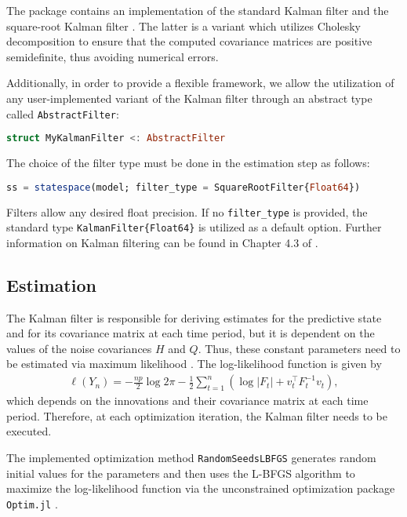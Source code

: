\documentclass{juliacon}
\begin{document}
The package contains an implementation of the standard Kalman filter and the square-root Kalman filter \cite{durbin2012time}. The latter is a variant which utilizes Cholesky decomposition to ensure that the computed covariance matrices are positive semidefinite, thus avoiding numerical errors.

Additionally, in order to provide a flexible framework, we allow the utilization of any user-implemented variant of the Kalman filter through an abstract type called \texttt{AbstractFilter}:
%
\begin{lstlisting}[language = Julia]
struct MyKalmanFilter <: AbstractFilter
\end{lstlisting}

The choice of the filter type must be done in the estimation step as follows:
%
\begin{lstlisting}[language = Julia]
ss = statespace(model; filter_type = SquareRootFilter{Float64})
\end{lstlisting}

Filters allow any desired float precision. If no \texttt{filter\_type} is provided, the standard type \texttt{KalmanFilter\{Float64\}} is utilized as a default option. Further information on Kalman filtering can be found in Chapter 4.3 of \cite{durbin2012time}.

\subsection{Estimation}

The Kalman filter is responsible for deriving estimates for the predictive state and for its covariance matrix at each time period, but it is dependent on the values of the noise covariances $H$ and $Q$. Thus, these constant parameters need to be estimated via maximum likelihood \cite{casella2002statistical}. The log-likelihood function is given by
%
\begin{align}
    \ell(Y_{n}) = -\frac{np}{2} \log 2 \pi - \frac{1}{2} \sum_{t=1}^{n} (\log |F_{t}| + v_{t}^{\top} F_{t}^{-1} v_{t}),
\end{align}
%
which depends on the innovations and their covariance matrix at each time period. Therefore, at each optimization iteration, the Kalman filter needs to be executed.

The implemented optimization method \texttt{RandomSeedsLBFGS} generates random initial values for the parameters and then uses the L-BFGS algorithm \cite{liu1989limited} to maximize the log-likelihood function via the unconstrained optimization package \texttt{Optim.jl} \cite{mogensen2018optim}.
\end{document}
